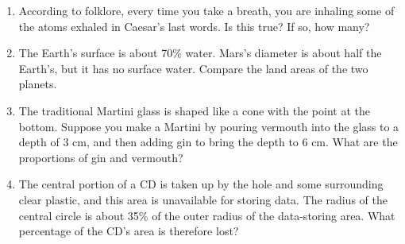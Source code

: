 \begin{enumerate}
\item  According to folklore, every time you take a breath, you
are inhaling some of the atoms exhaled in Caesar's
last words. Is this true? If so, how many?

\item  The Earth's surface is about 70\% water. Mars's diameter
is about half the Earth's, but it has no surface water.
Compare the land areas of the two planets.

\item 
  The traditional Martini glass is shaped like a cone
with the point at the bottom. Suppose you make a Martini by
pouring vermouth into the glass to a depth of 3 cm, and then
adding gin to bring the depth to 6 cm. What are the
proportions of gin and vermouth?

\item 
 The central portion of a CD is taken up by the hole
and some surrounding clear plastic, and this area is
unavailable for storing data. The radius of the central
circle is about 35\% of the outer radius of the data-storing area.
What percentage of the CD's area is therefore lost? 





\newcommand{\tikzAngleOfLine}{\tikz@AngleOfLine}
  \def\tikz@AngleOfLine(#1)(#2)#3{%
  \pgfmathanglebetweenpoints{%
    \pgfpointanchor{#1}{center}}{%
    \pgfpointanchor{#2}{center}}
  \pgfmathsetmacro{#3}{\pgfmathresult}%
 }



\end{enumerate}
